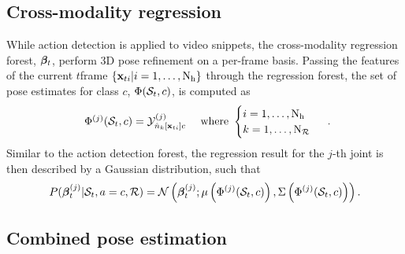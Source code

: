 \subsection{Cross-modality regression}

While action detection is applied to video snippets, the cross-modality regression forest, $\boldsymbol{\beta}_{t}$, perform 3D pose refinement on a per-frame basis. 
Passing the features of the current $t$\ssth frame $\{\mathbf{x}_{ti}|i = 1,\dots,\mathrm{N_{h}}\}$ through the regression forest, the set of pose estimates for class $c$, $\Phi(\mathcal{S}_{t}, c)$, is computed as
\begin{equation}
	\label{eqn/body/regressset}
	\begin{array}{lr}
		\Phi^{(j)}(\mathcal{S}_{t}, c) = \mathcal{Y}^{(j)}_{{\hat{n}}_{k}[\mathbf{x}_{ti}]c}
		& \mbox{ where } 
		\begin{cases}
			i = 1,\dots,\mathrm{N_{h}} \\ 
			k = 1,\dots,\mathrm{N_{\mathcal{R}}}
		\end{cases}
	\end{array}.
\end{equation} 
Similar to the action detection forest, the regression result for the $j$-th joint is then described by a Gaussian distribution, such that 
\begin{equation}
	\label{eqn/body/regressiongaussian}
	P( \boldsymbol{\beta}_{t}^{(j)}| \mathcal{S}_{t}, a = c, \mathcal{R}) = \mathcal{N}\left(\boldsymbol{\beta}_{t}^{(j)};\mu\left(\Phi^{(j)}(\mathcal{S}_{t}, c)\right),\Sigma\left(\Phi^{(j)}(\mathcal{S}_{t},c)\right)\right). 
\end{equation}

\subsection{Combined pose estimation}
\label{sec/body/combine}

